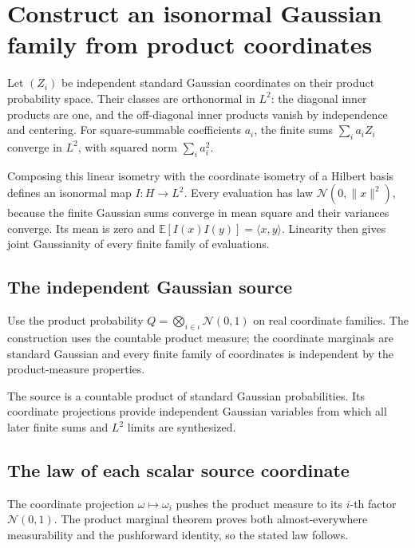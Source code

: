 \documentclass[11pt,a4paper]{article}
\begin{document}
\section{\texorpdfstring{Construct an isonormal Gaussian family from product coordinates}{Construct an isonormal Gaussian family from product coordinates}}


Let \((Z_i)\) be independent standard Gaussian coordinates on their product probability space. Their classes are orthonormal in \(L^2\): the diagonal inner products are one, and the off-diagonal inner products vanish by independence and centering. For square-summable coefficients \(a_i\), the finite sums \(\sum_i a_iZ_i\) converge in \(L^2\), with squared norm \(\sum_i a_i^2\).



Composing this linear isometry with the coordinate isometry of a Hilbert basis defines an isonormal map \(I:H\to L^2\). Every evaluation has law \(\mathcal N(0,\|x\|^2)\), because the finite Gaussian sums converge in mean square and their variances converge. Its mean is zero and \(\mathbb E[I(x)I(y)]=\langle x,y\rangle\). Linearity then gives joint Gaussianity of every finite family of evaluations.


\subsection{\texorpdfstring{The independent Gaussian source}{The independent Gaussian source}}


Use the product probability \(Q=\bigotimes_{i\in\iota}\mathcal N(0,1)\) on real coordinate families. The construction uses the countable product measure; the coordinate marginals are standard Gaussian and every finite family of coordinates is independent by the product-measure properties.



The source is a countable product of standard Gaussian probabilities. Its coordinate projections provide independent Gaussian variables from which all later finite sums and \(L^2\) limits are synthesized.


\subsection{\texorpdfstring{The law of each scalar source coordinate}{The law of each scalar source coordinate}}


The coordinate projection \(\omega\mapsto\omega_i\) pushes the product measure to its \(i\)-th factor \(\mathcal N(0,1)\). The product marginal theorem proves both almost-everywhere measurability and the pushforward identity, so the stated law follows.
\end{document}

